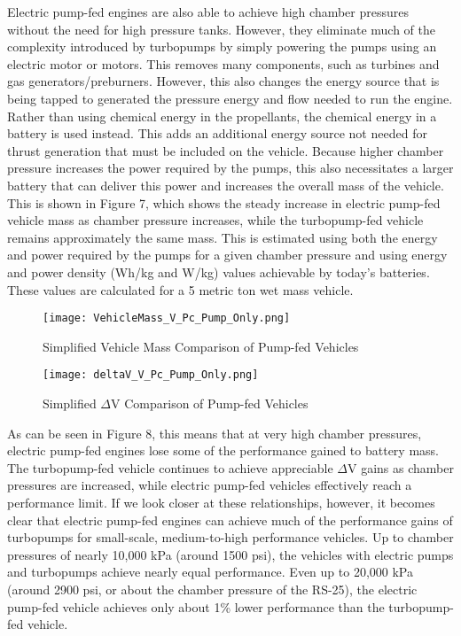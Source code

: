 \documentclass[12pt, letterpaper]{article}
\begin{document}
Electric pump-fed engines are also able to achieve high chamber pressures without the need for high pressure tanks. However, they eliminate much of the complexity introduced by turbopumps by simply powering the pumps using an electric motor or motors. This removes many components, such as turbines and gas generators/preburners. However, this also changes the energy source that is being tapped to generated the pressure energy and flow needed to run the engine. Rather than using chemical energy in the propellants, the chemical energy in a battery is used instead. This adds an additional energy source not needed for thrust generation that must be included on the vehicle. Because higher chamber pressure increases the power required by the pumps, this also necessitates a larger battery that can deliver this power and increases the overall mass of the vehicle. This is shown in Figure 7, which shows the steady increase in electric pump-fed vehicle mass as chamber pressure increases, while the turbopump-fed vehicle remains approximately the same mass. This is estimated using both the energy and power required by the pumps for a given chamber pressure and using energy and power density (Wh/kg and W/kg) values achievable by today's batteries. These values are calculated for a 5 metric ton wet mass vehicle.

\begin{figure}[]
    \centering
    \texttt{[image: VehicleMass\_V\_Pc\_Pump\_Only.png]}
    \caption{Simplified Vehicle Mass Comparison of Pump-fed Vehicles}
\end{figure}

\begin{figure}[]
    \centering
    \texttt{[image: deltaV\_V\_Pc\_Pump\_Only.png]}
    \caption{Simplified $\Delta$V Comparison of Pump-fed Vehicles}
\end{figure}

As can be seen in Figure 8, this means that at very high chamber pressures, electric pump-fed engines lose some of the performance gained to battery mass. The turbopump-fed vehicle continues to achieve appreciable $\Delta $V gains as chamber pressures are increased, while electric pump-fed vehicles effectively reach a performance limit. If we look closer at these relationships, however, it becomes clear that electric pump-fed engines can achieve much of the performance gains of turbopumps for  small-scale, medium-to-high performance vehicles. Up to chamber pressures of nearly 10,000 kPa (around 1500 psi), the vehicles with electric pumps and turbopumps achieve nearly equal performance. Even up to 20,000 kPa (around 2900 psi, or about the chamber pressure of the RS-25), the electric pump-fed vehicle achieves only about 1\% lower performance than the turbopump-fed vehicle.
\end{document}
